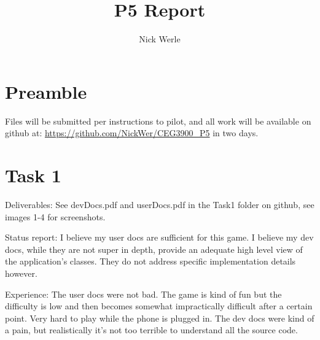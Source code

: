 \documentclass{article}
\title{P5 Report}
\author{Nick Werle}
\begin{document}
\maketitle
\section{Preamble}
Files will be submitted per instructions to pilot, and all work will be available on github at: \url{https://github.com/NickWer/CEG3900_P5} in two days.

\section{Task 1}
Deliverables: See devDocs.pdf and userDocs.pdf in the Task1 folder on github, see images 1-4 for screenshots.

Status report: I believe my user docs are sufficient for this game. I believe my dev docs, while they are not super in depth, provide an adequate high level view of the application's classes. They do not address specific implementation details however.

Experience: The user docs were not bad. The game is kind of fun but the difficulty is low and then becomes somewhat impractically difficult after a certain point. Very hard to play while the phone is plugged in. The dev docs were kind of a pain, but realistically it's not too terrible to understand all the source code.
\end{document}
